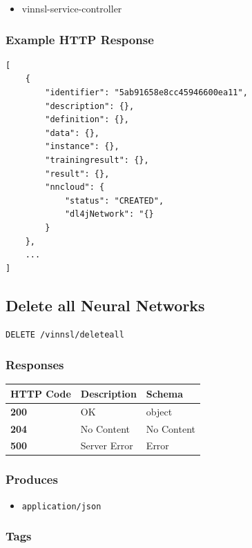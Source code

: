 \begin{itemize}
\tightlist
\item
  vinnsl-service-controller
\end{itemize}

\subsubsection{Example HTTP Response}\label{example-http-response-1}

\begin{verbatim}
[
    {
        "identifier": "5ab91658e8cc45946600ea11",
        "description": {},
        "definition": {},
        "data": {},
        "instance": {},
        "trainingresult": {},
        "result": {},
        "nncloud": {
            "status": "CREATED",
            "dl4jNetwork": "{}
        }
    },
    ...
]
\end{verbatim}

\subsection{Delete all Neural
Networks}\label{delete-all-neural-networks}

\begin{verbatim}
DELETE /vinnsl/deleteall
\end{verbatim}

\subsubsection{Responses}\label{responses-2}

\begin{longtable}[]{@{}lll@{}}
\toprule
HTTP Code & Description & Schema\tabularnewline
\midrule
\endhead
\textbf{200} & OK & object\tabularnewline
\textbf{204} & No Content & No Content\tabularnewline
\textbf{500} & Server Error & Error\tabularnewline
\bottomrule
\end{longtable}

\subsubsection{Produces}\label{produces-2}

\begin{itemize}
\tightlist
\item
  \texttt{application/json}
\end{itemize}

\subsubsection{Tags}\label{tags-2}

